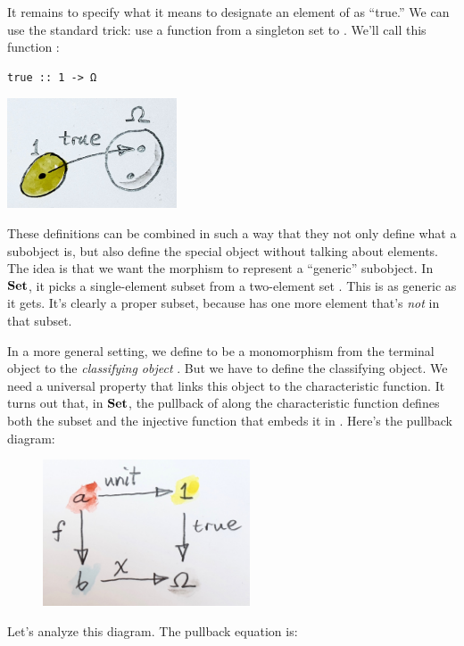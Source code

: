 It remains to specify what it means to designate an element of
 as ``true.'' We can use the standard trick: use a function
from a singleton set to . We'll call this function
:

\begin{Verbatim}[commandchars=\\\{\}]
true :: 1 -> Ω
\end{Verbatim}
\includegraphics[width=1.97917in]{images/true.jpg}

These definitions can be combined in such a way that they not only
define what a subobject is, but also define the special object
 without talking about elements. The idea is that we want the
morphism  to represent a ``generic'' subobject. In
$\mathbf{Set}$, it picks a single-element subset from a two-element set
. This is as generic as it gets. It's clearly a proper subset,
because  has one more element that's \emph{not} in that
subset.

In a more general setting, we define  to be a monomorphism
from the terminal object to the \emph{classifying object} .
But we have to define the classifying object. We need a universal
property that links this object to the characteristic function. It turns
out that, in $\mathbf{Set}$, the pullback of  along the
characteristic function  defines both the subset 
and the injective function that embeds it in . Here's the
pullback diagram:

\begin{figure}[H]
\centering
\includegraphics[width=2.41667in]{images/pullback.jpg}
\end{figure}

\noindent
Let's analyze this diagram. The pullback equation is:

